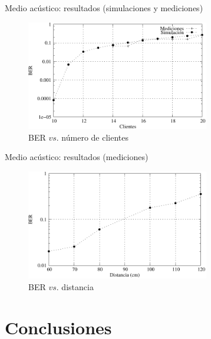\documentclass[aspectratio=169]{beamer}
\begin{document}
\begin{frame}{Medio acústico: resultados (simulaciones y mediciones)}
  
  \begin{figure}[t]
  \centering  
    \includegraphics[width=8cm]{graphs/medidas_clientes_JIS-fig6}
    \\ BER $vs.$ número de clientes
    \label{ios_process_mem}
\end{figure}

\end{frame}

\begin{frame}{Medio acústico: resultados (mediciones)}
  
\begin{figure}[t]
  \centering  
    \includegraphics[width=8cm]{graphs/mediciones-distancia-fig7}
    \\ BER $vs.$ distancia
    \label{ios_process_mem}
\end{figure}

\end{frame}



\section{Conclusiones}
\frame{\tableofcontents[currentsection]}
\end{document}
